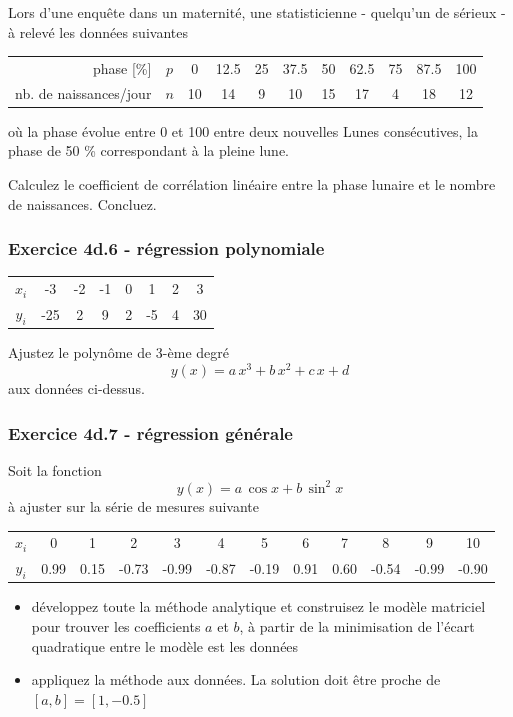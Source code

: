 \documentclass[main.tex]{subfiles}
\begin{document}
Lors d'une enquête dans un maternité, une statisticienne - quelqu'un de sérieux - à relevé les données suivantes
\begin{center}
    \begin{tabular}{r|c|ccccccccc}
        phase [\%]             & $p$ & 0  & 12.5 & 25 & 37.5 & 50 & 62.5 & 75 & 87.5 & 100 \\
        nb. de naissances/jour & $n$ & 10 & 14   & 9  & 10   & 15 & 17   & 4  & 18   & 12
    \end{tabular}
\end{center}
où la phase évolue entre 0 et 100 entre deux nouvelles Lunes consécutives, la phase de 50 \% correspondant à la pleine lune.

Calculez le coefficient de corrélation linéaire entre la phase lunaire et le nombre de naissances. Concluez.

\subsubsection*{Exercice 4d.6 - régression polynomiale}

\begin{center}
    \begin{tabular}{c|ccccccc}
        $x_i$ & -3  & -2 & -1 & 0 & 1  & 2 & 3  \\
        $y_i$ & -25 & 2  & 9  & 2 & -5 & 4 & 30
    \end{tabular}
\end{center}
Ajustez le polynôme de 3-ème degré $$y(x)=a\,x^3+b\,x^2+c\,x+d$$ aux données ci-dessus.

\subsubsection*{Exercice 4d.7 - régression générale}

Soit la fonction
$$
    y(x)=a\,\cos{x}+b\,\sin^{2}{x}
$$
à ajuster sur la série de mesures suivante
\begin{center}
    \begin{tabular}{c|ccccccccccc}
        $x_i$ & 0    & 1    & 2     & 3     & 4     & 5     & 6    & 7    & 8     & 9     & 10    \\
        $y_i$ & 0.99 & 0.15 & -0.73 & -0.99 & -0.87 & -0.19 & 0.91 & 0.60 & -0.54 & -0.99 & -0.90
    \end{tabular}
\end{center}
\begin{itemize}
    \item développez toute la méthode analytique et construisez le modèle matriciel pour trouver les coefficients $a$ et $b$, à partir de la minimisation de l'écart quadratique entre le modèle est les données
    \item appliquez la méthode aux données. La solution doit être proche de $[a,b]=[1,-0.5]$
\end{itemize}
\end{document}
